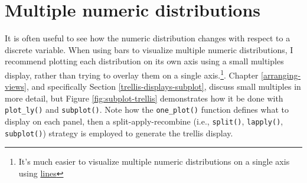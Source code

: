 \documentclass[
  12pt,
]{krantz}
\newenvironment{Shaded}{\begin{snugshade}}{\end{snugshade}}
\newcommand{\ControlFlowTok}[1]{\textcolor[rgb]{0.13,0.29,0.53}{\textbf{#1}}}
\newcommand{\DataTypeTok}[1]{\textcolor[rgb]{0.13,0.29,0.53}{#1}}
\newcommand{\DecValTok}[1]{\textcolor[rgb]{0.00,0.00,0.81}{#1}}
\newcommand{\FloatTok}[1]{\textcolor[rgb]{0.00,0.00,0.81}{#1}}
\newcommand{\KeywordTok}[1]{\textcolor[rgb]{0.13,0.29,0.53}{\textbf{#1}}}
\newcommand{\NormalTok}[1]{#1}
\newcommand{\OperatorTok}[1]{\textcolor[rgb]{0.81,0.36,0.00}{\textbf{#1}}}
\newcommand{\OtherTok}[1]{\textcolor[rgb]{0.56,0.35,0.01}{#1}}
\newcommand{\StringTok}[1]{\textcolor[rgb]{0.31,0.60,0.02}{#1}}
\begin{document}
\hypertarget{multiple-numeric-distributions}{%
\section{Multiple numeric distributions}\label{multiple-numeric-distributions}}

It is often useful to see how the numeric distribution changes with respect to a discrete variable. When using bars to visualize multiple numeric distributions, I recommend plotting each distribution on its own axis using a small multiples display, rather than trying to overlay them on a single axis.\footnote{It's much easier to visualize multiple numeric distributions on a single axis using \protect\hyperlink{lines}{lines}}. Chapter \ref{arranging-views}, and specifically Section \ref{trellis-displays-subplot}, discuss small multiples in more detail, but Figure \ref{fig:subplot-trellis} demonstrates how it be done with \texttt{plot\_ly()} and \texttt{subplot()}. Note how the \texttt{one\_plot()} function defines what to display on each panel, then a split-apply-recombine (i.e., \texttt{split()}, \texttt{lapply()}, \texttt{subplot()}) strategy is employed to generate the trellis display.

\begin{Shaded}
\end{Shaded}
\end{document}
